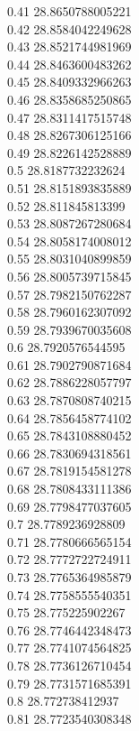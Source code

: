 {0.41	28.8650788005221\\
0.42	28.8584042249628\\
0.43	28.8521744981969\\
0.44	28.8463600483262\\
0.45	28.8409332966263\\
0.46	28.8358685250865\\
0.47	28.8311417515748\\
0.48	28.8267306125166\\
0.49	28.8226142528889\\
0.5	28.8187732232624\\
0.51	28.8151893835889\\
0.52	28.811845813399\\
0.53	28.8087267280684\\
0.54	28.8058174008012\\
0.55	28.8031040899859\\
0.56	28.8005739715845\\
0.57	28.7982150762287\\
0.58	28.7960162307092\\
0.59	28.7939670035608\\
0.6	28.7920576544595\\
0.61	28.7902790871684\\
0.62	28.7886228057797\\
0.63	28.7870808740215\\
0.64	28.7856458774102\\
0.65	28.7843108880452\\
0.66	28.7830694318561\\
0.67	28.7819154581278\\
0.68	28.7808433111386\\
0.69	28.7798477037605\\
0.7	28.7789236928809\\
0.71	28.7780666565154\\
0.72	28.7772722724911\\
0.73	28.7765364985879\\
0.74	28.7758555540351\\
0.75	28.775225902267\\
0.76	28.7746442348473\\
0.77	28.7741074564825\\
0.78	28.7736126710454\\
0.79	28.7731571685391\\
0.8	28.772738412937\\
0.81	28.7723540308348\\
}

